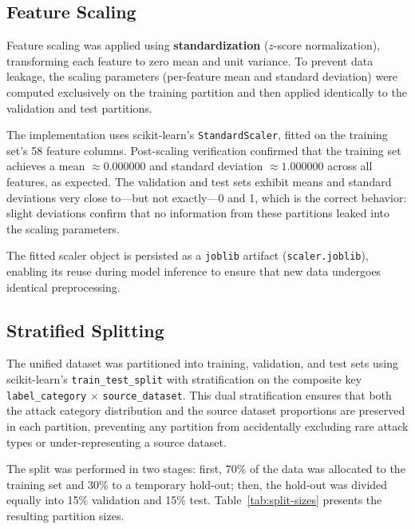 \subsection{Feature Scaling}
\label{subsec:scaling-execution}

Feature scaling was applied using \textbf{standardization} ($z$-score normalization), transforming each feature to zero mean and unit variance. To prevent data leakage, the scaling parameters (per-feature mean and standard deviation) were computed exclusively on the training partition and then applied identically to the validation and test partitions.

The implementation uses scikit-learn's \texttt{StandardScaler}, fitted on the training set's 58 feature columns. Post-scaling verification confirmed that the training set achieves a mean $\approx 0.000000$ and standard deviation $\approx 1.000000$ across all features, as expected. The validation and test sets exhibit means and standard deviations very close to---but not exactly---0 and 1, which is the correct behavior: slight deviations confirm that no information from these partitions leaked into the scaling parameters.

The fitted scaler object is persisted as a \texttt{joblib} artifact (\texttt{scaler.joblib}), enabling its reuse during model inference to ensure that new data undergoes identical preprocessing.

\subsection{Stratified Splitting}
\label{subsec:splitting-execution}

The unified dataset was partitioned into training, validation, and test sets using scikit-learn's \texttt{train\_test\_split} with stratification on the composite key \texttt{label\_category} $\times$ \texttt{source\_dataset}. This dual stratification ensures that both the attack category distribution and the source dataset proportions are preserved in each partition, preventing any partition from accidentally excluding rare attack types or under-representing a source dataset.

The split was performed in two stages: first, 70\% of the data was allocated to the training set and 30\% to a temporary hold-out; then, the hold-out was divided equally into 15\% validation and 15\% test. Table~\ref{tab:split-sizes} presents the resulting partition sizes.

